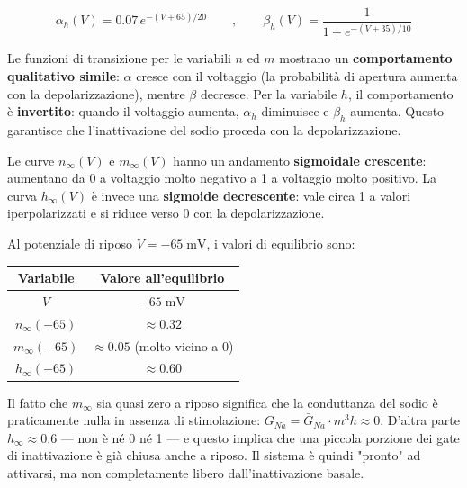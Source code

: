 \begin{equation}
\alpha_h(V) = 0.07 \, e^{-(V+65)/20}
\quad \quad  ,  \quad \quad
\beta_h(V) = \frac{1}{1 + e^{-(V+35)/10}}
\end{equation}


Le funzioni di transizione per le variabili $n$ ed $m$ mostrano un \textbf{comportamento qualitativo simile}: $\alpha$ cresce con il voltaggio (la probabilità di apertura aumenta con la depolarizzazione), mentre $\beta$ decresce. Per la variabile $h$, il comportamento è \textbf{invertito}: quando il voltaggio aumenta, $\alpha_h$ diminuisce e $\beta_h$ aumenta. Questo garantisce che l'inattivazione del sodio proceda con la depolarizzazione.


Le curve $n_\infty(V)$ e $m_\infty(V)$ hanno un andamento \textbf{sigmoidale crescente}: aumentano da 0 a voltaggio molto negativo a 1 a voltaggio molto positivo. La curva $h_\infty(V)$ è invece una \textbf{sigmoide decrescente}: vale circa 1 a valori iperpolarizzati e si riduce verso 0 con la depolarizzazione.

Al potenziale di riposo $V = -65 \; \text{mV}$, i  valori di equilibrio sono:

\begin{table}[htbp]
    \centering
    \renewcommand{\arraystretch}{1.3}
    \begin{tabular}{|c|c|}
    \hline
    \textbf{Variabile} & \textbf{Valore all'equilibrio} \\
    \hline
    $V$ & $-65 \; \text{mV}$ \\
    $n_\infty(-65)$ & $\approx 0.32$ \\
    $m_\infty(-65)$ & $\approx 0.05$ (molto vicino a 0) \\
    $h_\infty(-65)$ & $\approx 0.60$ \\
    \hline
    \end{tabular}
\end{table}

\begin{tcolorbox}[colback=gray!5, colframe=gray!40, arc=2mm, boxrule=0.5pt]
Il fatto che $m_\infty$ sia quasi zero a riposo significa che la conduttanza del sodio è praticamente nulla in assenza di stimolazione: $G_{Na} = \bar{G}_{Na} \cdot m^3 h \approx 0$. D'altra parte $h_\infty \approx 0.6$ — non è né 0 né 1 — e questo implica che una piccola porzione dei gate di inattivazione è già chiusa anche a riposo. Il sistema è quindi "pronto" ad attivarsi, ma non completamente libero dall'inattivazione basale.
\end{tcolorbox}

